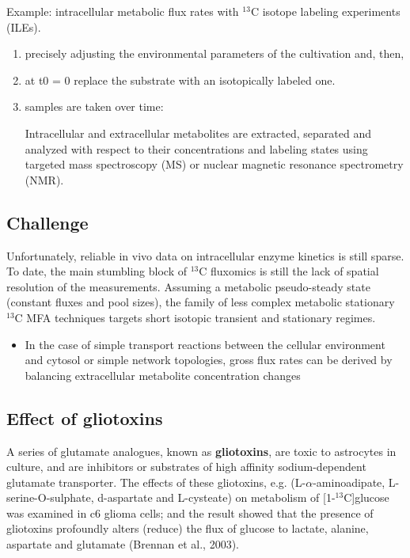 Example: intracellular metabolic flux rates with $^{13}$C isotope labeling
experiments (ILEs).
\begin{enumerate}
  \item  precisely adjusting the environmental parameters of the cultivation
  and, then, 
  
  \item at t0 = 0 replace the substrate with an isotopically labeled one.
  
  \item samples are taken over time:
  
Intracellular and extracellular metabolites are extracted, separated and
analyzed with respect to their concentrations and labeling states using targeted
mass spectroscopy (MS) or nuclear magnetic resonance spectrometry (NMR).

\end{enumerate}

\subsection{Challenge}

Unfortunately, reliable in vivo data on intracellular enzyme kinetics is still
sparse.
To date, the main stumbling block of $^{13}$C fluxomics is still the lack of
spatial resolution of the measurements. Assuming a metabolic pseudo-steady state
(constant fluxes and pool sizes), the family of less complex metabolic
stationary $^{13}$C MFA techniques targets short isotopic transient and
stationary regimes.

\begin{itemize}
  
  \item   In the case of simple transport reactions between the cellular
  environment and cytosol or simple network topologies, gross flux rates can be
  derived by balancing extracellular metabolite concentration changes
  
  
\end{itemize}

\subsection{Effect of gliotoxins}

A series of glutamate analogues, known as {\bf gliotoxins}, are toxic to
astrocytes in culture, and are inhibitors or substrates of high affinity
sodium-dependent glutamate transporter.
The effects of these gliotoxins, e.g. (L-$\alpha$-aminoadipate,
L-serine-O-sulphate, d-aspartate and L-cysteate) on metabolism of
[1-$^{13}$C]glucose was examined in c6 glioma cells; and the result showed that
the presence of gliotoxins profoundly alters (reduce) the flux of glucose to
lactate, alanine, aspartate and glutamate (Brennan et al., 2003).

